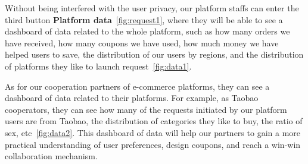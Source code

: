 Without being interfered with the user privacy, our platform staffs can enter the third button \textbf{Platform data}~\ref{fig:request1}, where they will be able to see a dashboard of data related to the whole platform, such as how many orders we have received, how many coupons we have used, how much money we have helped users to save, the distribution of our users by regions, and the distribution of platforms they like to launch request~\ref{fig:data1}.

As for our cooperation partners of e-commerce platforms, they can see a dashboard of data related to their platforms. For example, as Taobao cooperators, they can see how many of the requests initiated by our platform users are from Taobao, the distribution of categories they like to buy, the ratio of sex, etc~\ref{fig:data2}. This dashboard of data will help our partners to gain a more practical understanding of user preferences, design coupons, and reach a win-win collaboration mechanism.
